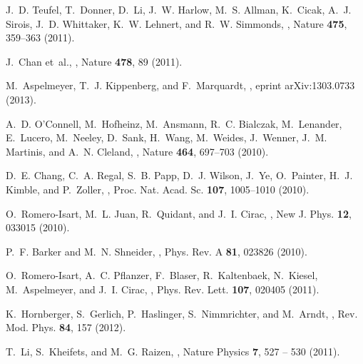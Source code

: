 \documentclass[12pt]{article}
\begin{document}
\begin{thebibliography}{100}
J.~D. Teufel, T.~Donner, D.~Li, J.~W. Harlow, M.~S. Allman, K.~Cicak, A.~J.
  Sirois, J.~D. Whittaker, K.~W. Lehnert, and R.~W. Simmonds,
,
\newblock Nature {\bf 475}, 359--363 (2011).

J.~Chan et~al.,
,
\newblock Nature {\bf 478}, 89 (2011).

M.~Aspelmeyer, T.~J. Kippenberg, and F.~Marquardt,
,
\newblock eprint arXiv:1303.0733  (2013).

A.~D. O'Connell, M.~Hofheinz, M.~Ansmann, R.~C. Bialczak, M.~Lenander,
  E.~Lucero, M.~Neeley, D.~Sank, H.~Wang, M.~Weides, J.~Wenner, J.~M. Martinis,
  and A.~N. Cleland,
,
\newblock Nature {\bf 464}, 697--703 (2010).

D.~E. Chang, C.~A. Regal, S.~B. Papp, D.~J. Wilson, J.~Ye, O.~Painter, H.~J.
  Kimble, and P.~Zoller,
,
\newblock Proc. Nat. Acad. Sc. {\bf 107}, 1005--1010 (2010).

O.~Romero-Isart, M.~L. Juan, R.~Quidant, and J.~I. Cirac,
,
\newblock New J. Phys. {\bf 12}, 033015 (2010).

P.~F. Barker and M.~N. Shneider,
,
\newblock Phys. Rev. A {\bf 81}, 023826 (2010).

O.~Romero-Isart, A.~C. Pflanzer, F.~Blaser, R.~Kaltenbaek, N.~Kiesel,
  M.~Aspelmeyer, and J.~I. Cirac,
,
\newblock Phys. Rev. Lett. {\bf 107}, 020405 (2011).

K.~Hornberger, S.~Gerlich, P.~Haslinger, S.~Nimmrichter, and M.~Arndt,
,
\newblock Rev. Mod. Phys. {\bf 84}, 157 (2012).

T.~Li, S.~Kheifets, and M.~G. Raizen,
,
\newblock Nature Physics {\bf 7}, 527 -- 530 (2011).


\end{thebibliography}
\end{document}
